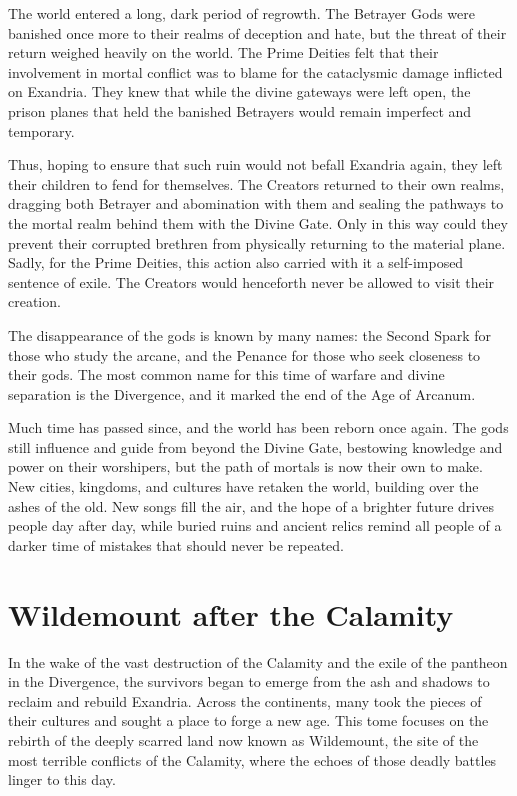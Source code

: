 \documentclass[10pt,a4paper,twoside,bg=print,twocolumn,openany,nodeprecatedcode]{dndbook}
\begin{document}
The world entered a long, dark period of regrowth. The Betrayer Gods were banished once more to their realms of deception and hate, but the threat of their return weighed heavily on the world. The Prime Deities felt that their involvement in mortal conflict was to blame for the cataclysmic damage inflicted on Exandria. They knew that while the divine gateways were left open, the prison planes that held the banished Betrayers would remain imperfect and temporary.

Thus, hoping to ensure that such ruin would not befall Exandria again, they left their children to fend for themselves. The Creators returned to their own realms, dragging both Betrayer and abomination with them and sealing the pathways to the mortal realm behind them with the Divine Gate. Only in this way could they prevent their corrupted brethren from physically returning to the material plane. Sadly, for the Prime Deities, this action also carried with it a self-imposed sentence of exile. The Creators would henceforth never be allowed to visit their creation.

The disappearance of the gods is known by many names: the Second Spark for those who study the arcane, and the Penance for those who seek closeness to their gods. The most common name for this time of warfare and divine separation is the Divergence, and it marked the end of the Age of Arcanum.

Much time has passed since, and the world has been reborn once again. The gods still influence and guide from beyond the Divine Gate, bestowing knowledge and power on their worshipers, but the path of mortals is now their own to make. New cities, kingdoms, and cultures have retaken the world, building over the ashes of the old. New songs fill the air, and the hope of a brighter future drives people day after day, while buried ruins and ancient relics remind all people of a darker time of mistakes that should never be repeated.

\section{Wildemount after the Calamity}
In the wake of the vast destruction of the Calamity and the exile of the pantheon in the Divergence, the survivors began to emerge from the ash and shadows to reclaim and rebuild Exandria. Across the continents, many took the pieces of their cultures and sought a place to forge a new age. This tome focuses on the rebirth of the deeply scarred land now known as Wildemount, the site of the most terrible conflicts of the Calamity, where the echoes of those deadly battles linger to this day.
\end{document}
